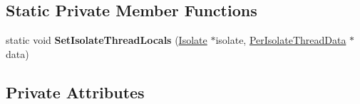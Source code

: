 \subsection*{Static Private Member Functions}
\begin{DoxyCompactItemize}
\item 
static void {\bfseries Set\+Isolate\+Thread\+Locals} (\hyperlink{classv8_1_1internal_1_1_isolate}{Isolate} $\ast$isolate, \hyperlink{classv8_1_1internal_1_1_isolate_1_1_per_isolate_thread_data}{Per\+Isolate\+Thread\+Data} $\ast$data)\hypertarget{classv8_1_1internal_1_1_isolate_a9b1a1630fc92fa14ca66a8f48aa282fb}{}\label{classv8_1_1internal_1_1_isolate_a9b1a1630fc92fa14ca66a8f48aa282fb}

\end{DoxyCompactItemize}
\subsection*{Private Attributes}
